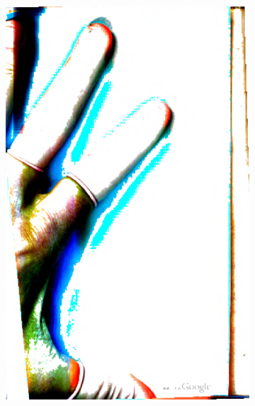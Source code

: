 \begin{figure}
\centering
    \begin{subfigure}[b]{0.4\textwidth}
\includegraphics[width=\textwidth]{resources/500_0002}
    \end{subfigure}
    \begin{subfigure}[b]{0.4\textwidth}

\end{subfigure}
\end{figure}
